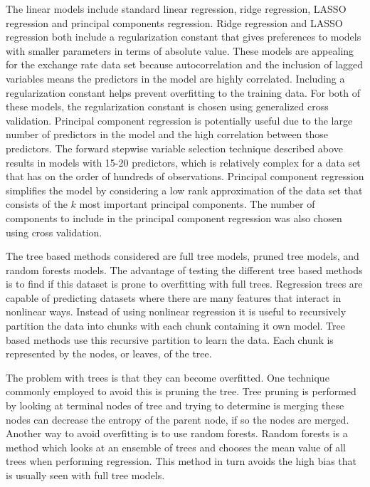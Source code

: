 \documentclass{sig-alternate-05-2015}
\begin{document}
\par{} The linear models include standard linear regression, ridge regression, LASSO regression and principal components regression. Ridge regression and LASSO regression both include a regularization constant that gives preferences to models with smaller parameters in terms of absolute value. These models are appealing for the exchange rate data set because autocorrelation and the inclusion of lagged variables means the predictors in the model are highly correlated. Including a regularization constant helps prevent overfitting to the training data. For both of these models, the regularization constant is chosen using generalized cross validation. Principal component regression is potentially useful due to the large number of predictors in the model and the high correlation between those predictors. The forward stepwise variable selection technique described above results in models with 15-20 predictors, which is relatively complex for a data set that has on the order of hundreds of observations. Principal component regression simplifies the model by considering a low rank approximation of the data set that consists of the $k$ most important principal components. The number of components to include in the principal component regression was also chosen using cross validation. 

\par{} The tree based methods considered are full tree models, pruned tree models, and random forests models. The advantage of testing the different tree based methods is to find if this dataset is prone to overfitting with full trees. Regression trees are capable of predicting datasets where there are many features that interact in nonlinear ways. Instead of using nonlinear regression it is useful to recursively partition the data into chunks with each chunk containing it own model. Tree based methods use this recursive partition to learn the data. Each chunk is represented by the nodes, or leaves, of the tree. 

\par{} The problem with trees is that they can become overfitted. One technique commonly employed to avoid this is pruning the tree. Tree pruning is performed by looking at terminal nodes of tree and trying to determine is merging these nodes can decrease the entropy of the parent node, if so the nodes are merged. Another way to avoid overfitting is to use random forests. Random forests is a method which looks at an ensemble of trees and chooses the mean value of all trees when performing regression. This method in turn avoids the high bias that is usually seen with full tree models.
\end{document}
